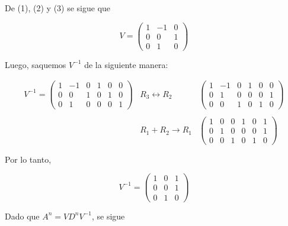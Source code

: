 \begin{enumerate}
    De (1), (2) y (3) se sigue que

    \begin{tcolorbox}
    $$V = \left(\begin{array}{*{3}{r}}
	1 & -1 & 0 \\
	0 & 0 & 1 \\
	0 & 1 & 0 
    \end{array}\right)$$
    \end{tcolorbox}

    Luego, saquemos $V^{-1}$ de la siguiente manera:

    $$\begin{array}{ccc}
	V^{-1}=\left(\begin{array}{*{6}{rrr|rrr}}
	    1 & -1 & 0 & 1 & 0 & 0 \\
	    0 & 0 & 1 & 0 & 1 & 0 \\
	    0 & 1 & 0 & 0 & 0 & 1 
	\end{array}\right)
	&
	R_3\leftrightarrow R_2
	&
	\left(\begin{array}{*{6}{rrr|rrr}}
	    1 & -1 & 0 & 1 & 0 & 0 \\
	    0 & 1 & 0 & 0 & 0 & 1  \\
	    0 & 0 & 1 & 0 & 1 & 0
	\end{array}\right)\\\\
	&
	R_1+R_2 \to R_1
	&
	\left(\begin{array}{*{6}{rrr|rrr}}
	    1 & 0 & 0 & 1 & 0 & 1 \\
	    0 & 1 & 0 & 0 & 0 & 1  \\
	    0 & 0 & 1 & 0 & 1 & 0
	\end{array}\right)\\\\
    \end{array}$$
    Por lo tanto,
    \begin{tcolorbox}
    $$V^{-1}=\left(\begin{array}{*{3}{c}}
	     1 & 0 & 1 \\
	     0 & 0 & 1  \\
	     0 & 1 & 0
    \end{array}\right)$$
    \end{tcolorbox}


    Dado que $A^n = VD^n V^{-1}$, se sigue


\end{enumerate}
